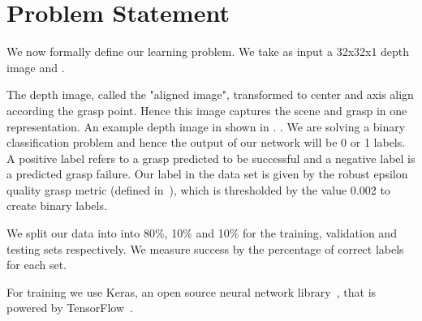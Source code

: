 
\section{Problem Statement}
\label{sec:problem}

We now formally define our learning problem. 
We take as input a 32x32x1 depth image and . 

The depth image, called the "aligned image", transformed to center and axis align according the grasp point. 
Hence this image captures the scene and grasp in one representation. 
An example depth image in shown in . . 
We are solving a binary classification problem and hence the output of our network will be 0 or 1 labels. 
A positive label refers to a grasp predicted to be successful and a negative label is a predicted grasp failure. 
Our label in the data set is given by the robust epsilon quality grasp metric (defined in~\cite{seita2016large}), which is thresholded by the value 0.002 to create binary labels.

We split our data into into 80\%, 10\% and 10\% for the training, validation and testing sets respectively.
We measure success by the percentage of correct labels for each set. 

For training we use Keras, an open source neural network library~\cite{chollet2017keras}, that is powered by TensorFlow~\cite{abadi2016tensorflow}. 
